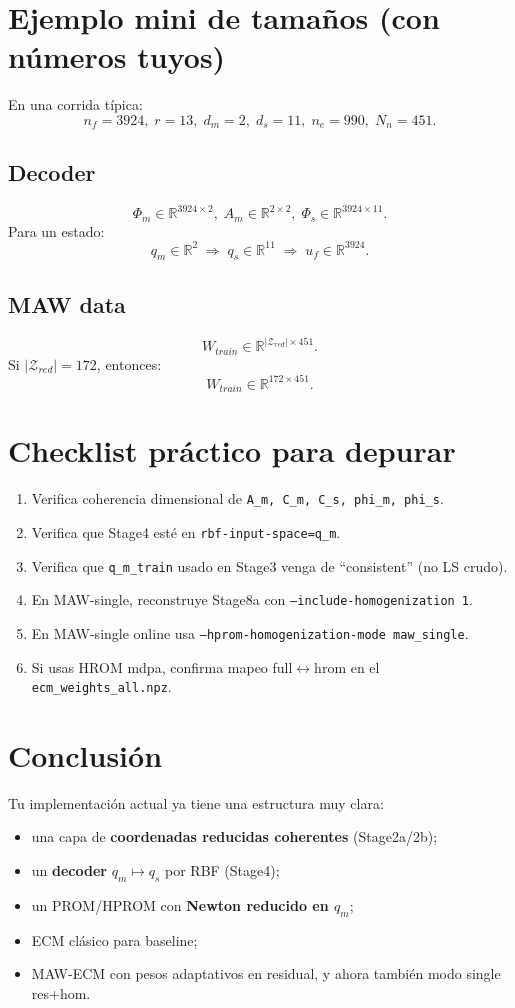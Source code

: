\documentclass[11pt,a4paper]{article}
\begin{document}
\section{Ejemplo mini de tamaños (con números tuyos)}
En una corrida típica:
\[
n_f=3924,\; r=13,\; d_m=2,\; d_s=11,\; n_e=990,\; N_n=451.
\]

\subsection{Decoder}
\[
\Phi_m\in\mathbb{R}^{3924\times 2},\;
A_m\in\mathbb{R}^{2\times 2},\;
\Phi_s\in\mathbb{R}^{3924\times 11}.
\]
Para un estado:
\[
q_m\in\mathbb{R}^{2}\;\Rightarrow\; q_s\in\mathbb{R}^{11}\;\Rightarrow\; u_f\in\mathbb{R}^{3924}.
\]

\subsection{MAW data}
\[
W_{train}\in\mathbb{R}^{|\mathcal{Z}_{red}|\times 451}.
\]
Si $|\mathcal{Z}_{red}|=172$, entonces:
\[
W_{train}\in\mathbb{R}^{172\times 451}.
\]

\section{Checklist práctico para depurar}
\begin{enumerate}[leftmargin=1.5em]
\item Verifica coherencia dimensional de \texttt{A\_m, C\_m, C\_s, phi\_m, phi\_s}.
\item Verifica que Stage4 esté en \texttt{rbf-input-space=q\_m}.
\item Verifica que \texttt{q\_m\_train} usado en Stage3 venga de ``consistent'' (no LS crudo).
\item En MAW-single, reconstruye Stage8a con \texttt{--include-homogenization 1}.
\item En MAW-single online usa \texttt{--hprom-homogenization-mode maw\_single}.
\item Si usas HROM mdpa, confirma mapeo full$\leftrightarrow$hrom en el \texttt{ecm\_weights\_all.npz}.
\end{enumerate}

\section{Conclusión}
Tu implementación actual ya tiene una estructura muy clara:
\begin{itemize}[leftmargin=1.5em]
\item una capa de \textbf{coordenadas reducidas coherentes} (Stage2a/2b);
\item un \textbf{decoder} $q_m\mapsto q_s$ por RBF (Stage4);
\item un PROM/HPROM con \textbf{Newton reducido en $q_m$};
\item ECM clásico para baseline;
\item MAW-ECM con pesos adaptativos en residual, y ahora también modo single res+hom.
\end{itemize}
\end{document}
